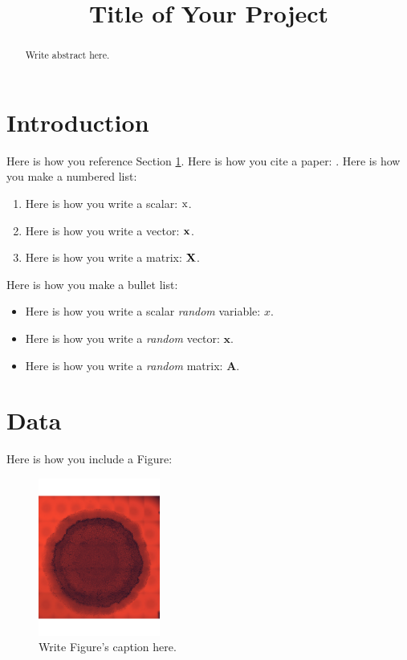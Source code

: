 \documentclass[conference]{IEEEtran}
\begin{document}
\title{Title of Your Project}
\author{
}
\maketitle

\begin{abstract}
Write abstract here.
\end{abstract}



\section{Introduction}
\label{secName}
Here is how you reference Section \ref{secName}. Here is how you cite a paper: \cite{paperName}. Here is how you make a numbered list:
\begin{enumerate}
\item
Here is how you write a scalar: ${\rm x}$.
\item
Here is how you write a vector: $\boldsymbol{\rm x}$.
\item
Here is how you write a matrix: $\boldsymbol{\rm X}$.
\end{enumerate}

Here is how you make a bullet list:
\begin{itemize}
\item
Here is how you write a scalar {\em random} variable: $x$.
\item
Here is how you write a {\em random} vector: $\boldsymbol{x}$.
\item
Here is how you write a {\em random} matrix: $\boldsymbol{A}$.
\end{itemize}

\section{Data}
Here is how you include a Figure:
\begin{figure}[h]
\centering
\includegraphics[width=4cm]{Figure_Example.pdf}
\caption{Write Figure's caption here.}
\label{figName}
\end{figure}
\end{document}
